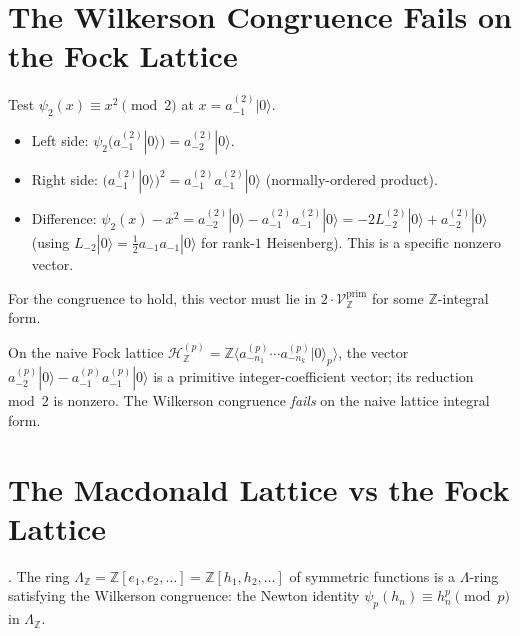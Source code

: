 \section{The Wilkerson Congruence Fails on the Fock Lattice}
\label{v4-arith:gb:wilkerson-fails}

\begin{computation}
\label{v4-arith:comp:wilkerson-test}
Test \(\psi_{2}(x)\equiv x^{2}\pmod{2}\) at \(x=a^{(2)}_{-1}|0\rangle\).
\begin{itemize}
\item Left side: \(\psi_{2}(a^{(2)}_{-1}|0\rangle)=a^{(2)}_{-2}|0\rangle\).
\item Right side: \((a^{(2)}_{-1}|0\rangle)^{2}=a^{(2)}_{-1}a^{(2)}_{-1}|0\rangle\)
(normally-ordered product).
\item Difference:
\(\psi_{2}(x)-x^{2}=a^{(2)}_{-2}|0\rangle-a^{(2)}_{-1}a^{(2)}_{-1}|0\rangle
=-2L^{(2)}_{-2}|0\rangle+a^{(2)}_{-2}|0\rangle\) (using
\(L_{-2}|0\rangle=\tfrac{1}{2}a_{-1}a_{-1}|0\rangle\) for rank-\(1\)
Heisenberg). This is a specific nonzero vector.
\end{itemize}
For the congruence to hold, this vector must lie in
\(2\cdot\mathcal{V}^{\mathrm{prim}}_{\mathbb{Z}}\) for some
\(\mathbb{Z}\)-integral form.
\end{computation}

\begin{observation}
\label{v4-arith:obs:lattice-form-failure}
On the naive Fock lattice
\(\mathcal{H}^{(p)}_{\mathbb{Z}}=\mathbb{Z}\langle a^{(p)}_{-n_{1}}\cdots a^{(p)}_{-n_{k}}|0\rangle_{p}\rangle\),
the vector \(a^{(p)}_{-2}|0\rangle-a^{(p)}_{-1}a^{(p)}_{-1}|0\rangle\)
is a primitive integer-coefficient vector; its reduction mod~\(2\)
is nonzero. The Wilkerson congruence \emph{fails} on the naive
lattice integral form.
\end{observation}

\section{The Macdonald Lattice vs the Fock Lattice}
\label{v4-arith:gb:macdonald-vs-fock-lattice}

\begin{theorem}
\label{v4-arith:thm:macdonald-lattice}
\ClaimStatusProvedElsewhere. The ring \(\Lambda_{\mathbb{Z}}=
\mathbb{Z}[e_{1},e_{2},\ldots]=\mathbb{Z}[h_{1},h_{2},\ldots]\) of
symmetric functions is a \(\Lambda\)-ring satisfying the Wilkerson
congruence: the Newton identity
\(\psi_{p}(h_{n})\equiv h_{n}^{p}\pmod{p}\) in
\(\Lambda_{\mathbb{Z}}\).
\end{theorem}

